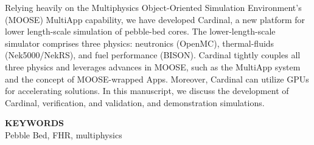 \documentclass[11pt,letterpaper,english]{article}
\begin{document}
Relying heavily on the Multiphysics Object-Oriented Simulation Environment's (MOOSE) MultiApp capability, we have developed Cardinal, a new platform for lower length-scale simulation of pebble-bed cores. The lower-length-scale simulator comprises three physics: neutronics (OpenMC), thermal-fluids (Nek5000/NekRS), and fuel performance (BISON).   Cardinal tightly couples all three physics and leverages advances in MOOSE, such as the MultiApp system and the concept of MOOSE-wrapped Apps. Moreover, Cardinal can utilize GPUs for accelerating solutions. In this manuscript, we discuss the development of Cardinal, verification, and validation, and demonstration simulations.

\begin{flushright}
{\bf KEYWORDS} \\
Pebble Bed, FHR, multiphysics
\end{flushright}

\doublespacing








%

%
%
%

%

\begin{center}
\scriptsize
{}
\normalsize
\end{center}
\end{document}
